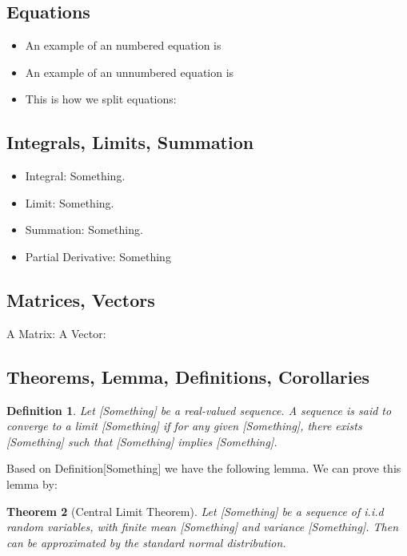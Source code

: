 \documentclass{article}
\newtheorem{definition}{Definition}[section]
\newtheorem{theorem}[definition]{Theorem}
\begin{document}
		\subsection{Equations}
			\begin{itemize}
				\item An example of an numbered equation is
				\item An example of an unnumbered equation is
				\item This is how we split equations:
			\end{itemize}
		\subsection{Integrals, Limits, Summation}
			\begin{itemize}
				\item Integral: Something.
				\item Limit: Something.
				\item Summation: Something.
				\item Partial Derivative: Something
			\end{itemize}
			
		\subsection{Matrices, Vectors}
			A Matrix:
			A Vector:
			
		\subsection{Theorems, Lemma, Definitions, Corollaries}
			\begin{definition}\label{convergence}
				Let [Something] be a real-valued sequence. A sequence is said to converge to a limit [Something] if for any given [Something], there exists [Something] such that [Something] implies [Something].
			\end{definition}
			Based on Definition[Something] we have the following lemma.
			We can prove this lemma by:
			\begin{theorem}[Central Limit Theorem]
				Let [Something] be a sequence of i.i.d random variables, with finite mean [Something] and variance [Something]. Then
				can be approximated by the standard normal distribution.
			\end{theorem}
\end{document}

